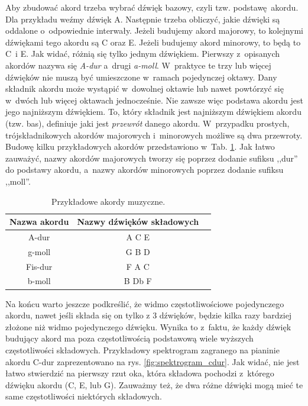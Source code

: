 Aby zbudować akord trzeba wybrać dźwięk bazowy, czyli tzw. podstawę akordu. Dla przykładu weźmy dźwięk A. Następnie trzeba obliczyć, jakie dźwięki są oddalone o~odpowiednie interwały. Jeżeli budujemy akord majorowy, to kolejnymi dźwiękami tego akordu są C\sh{} oraz E. Jeżeli budujemy akord minorowy, to będą to C~i E. Jak widać, różnią się tylko jednym dźwiękiem. Pierwszy z~opisanych akordów nazywa się \emph{A-dur} a~drugi \emph{a-moll}. W~praktyce te trzy lub więcej dźwięków nie muszą być umieszczone w~ramach pojedynczej oktawy. Dany składnik akordu może wystąpić w~dowolnej oktawie lub nawet powtórzyć się w~dwóch lub więcej oktawach jednocześnie. Nie zawsze więc podstawa akordu jest jego najniższym dźwiękiem. To, który składnik jest najniższym dźwiękiem akordu (tzw. bas), definiuje jaki jest \emph{przewrót} danego akordu. W~przypadku prostych, trójskładnikowych akordów majorowych i~minorowych możliwe są dwa przewroty. Budowę kilku przykładowych akordów przedstawiono w~Tab. \ref{tab:przykladowe_akordy}. Jak łatwo zauważyć, nazwy akordów majorowych tworzy się poprzez dodanie sufiksu ,,dur'' do podstawy akordu, a~nazwy akordów minorowych poprzez dodanie sufiksu ,,moll''.

\begin{table}[htb]
    \centering
    \caption{Przykładowe akordy muzyczne.}
    \label{tab:przykladowe_akordy}
    \begin{tabular}{|c|c|c|} \hline
        Nazwa akordu & Nazwy dźwięków składowych \\ \hline
        A-dur   & A  C\sh{} E  \\
        g-moll  & G  B  D  \\
        Fis-dur  & F\sh{} A\sh{} C\sh{} \\
        b-moll  & B  Db F  \\ \hline
    \end{tabular}
\end{table}

Na końcu warto jeszcze podkreślić, że widmo częstotliwościowe pojedynczego akordu, nawet jeśli składa się on tylko z $3$ dźwięków, będzie kilka razy bardziej złożone niż widmo pojedynczego dźwięku. Wynika to z~faktu, że każdy dźwięk budujący akord ma poza częstotliwością podstawową wiele wyższych częstotliwości składowych. Przykładowy spektrogram zagranego na pianinie akordu C-dur zaprezentowano na rys. \ref{fig:spektrogram_cdur}. Jak widać, nie jest łatwo stwierdzić na pierwszy rzut oka, która składowa pochodzi z~którego dźwięku akordu (C, E, lub G). Zauważmy też, że dwa różne dźwięki mogą mieć te same częstotliwości niektórych składowych.

